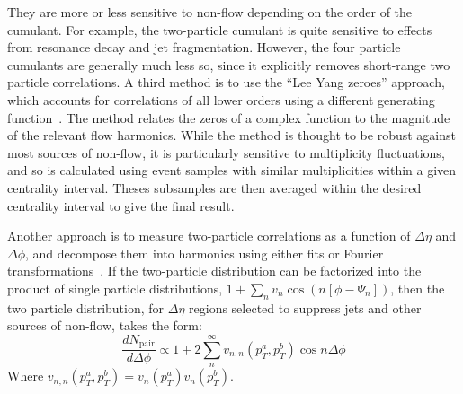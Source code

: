 They are more or less sensitive to non-flow depending on the order of the cumulant.  For example, the two-particle
cumulant is quite sensitive to effects from resonance decay and jet fragmentation.  However, the four particle
cumulants are generally much less so, since it explicitly removes short-range two particle correlations.
%
A third method is to use the ``Lee Yang zeroes'' approach, which accounts for correlations of all lower orders using a
different generating function~\cite{Bhalerao:2003yq,Borghini:2004ke}.  
The method relates the zeros of a complex function to the magnitude of the relevant
flow harmonics.  While the method is thought to be robust against most sources of non-flow, it is particularly sensitive to
multiplicity fluctuations, and so is calculated using event samples with similar multiplicities within a given
centrality interval.  Theses subsamples are then averaged within the desired centrality interval to give the final result.

Another approach is to measure two-particle correlations as a function of $\Delta\eta$ and $\Delta\phi$, and
decompose them into harmonics using either fits or Fourier transformations~\cite{ATLAS:2012at,Aamodt:2011by,ALICE:2011ab}.
If the two-particle distribution can be factorized into the product of single particle distributions, $1+\sum_n v_n \cos(n[\phi-\Psi_n])$, then
the two particle distribution, for $\Delta\eta$ regions selected to suppress jets and other sources of non-flow, takes the form:
\begin{equation}
\frac{dN_{\mathrm{pair}}}{d\Delta\phi} \propto 1 + 2 \sum_n^{\infty} v_{n,n}(p_T^a,p_T^b) \cos n\Delta\phi
\end{equation}
Where $v_{n,n}(p_T^a,p_T^b) = v_n(p_T^a) v_n(p_T^b)$.

